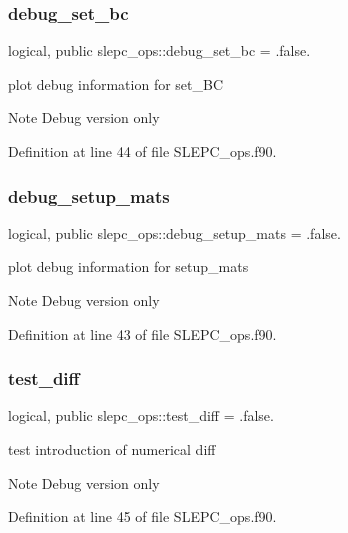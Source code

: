 \subsubsection{\texorpdfstring{debug\+\_\+set\+\_\+bc}{debug\_set\_bc}}
{\footnotesize\ttfamily logical, public slepc\+\_\+ops\+::debug\+\_\+set\+\_\+bc = .false.}



plot debug information for set\+\_\+\+BC 

\begin{DoxyNote}{Note}
Debug version only 
\end{DoxyNote}


Definition at line 44 of file S\+L\+E\+P\+C\+\_\+ops.\+f90.

\mbox{\label{namespaceslepc__ops_aff5aa0d485bc34e2f6e320172fcc4ccb}} 
\subsubsection{\texorpdfstring{debug\+\_\+setup\+\_\+mats}{debug\_setup\_mats}}
{\footnotesize\ttfamily logical, public slepc\+\_\+ops\+::debug\+\_\+setup\+\_\+mats = .false.}



plot debug information for setup\+\_\+mats 

\begin{DoxyNote}{Note}
Debug version only 
\end{DoxyNote}


Definition at line 43 of file S\+L\+E\+P\+C\+\_\+ops.\+f90.

\mbox{\label{namespaceslepc__ops_a57d0ef4131e939894b34bb07e30e631b}} 
\subsubsection{\texorpdfstring{test\+\_\+diff}{test\_diff}}
{\footnotesize\ttfamily logical, public slepc\+\_\+ops\+::test\+\_\+diff = .false.}



test introduction of numerical diff 

\begin{DoxyNote}{Note}
Debug version only 
\end{DoxyNote}


Definition at line 45 of file S\+L\+E\+P\+C\+\_\+ops.\+f90.

